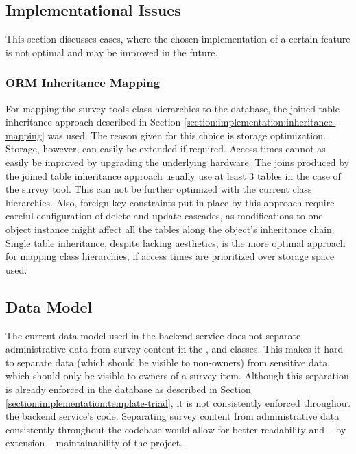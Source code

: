     \subsection{Implementational Issues}
    	This section discusses cases, where the chosen implementation
    	of a certain feature is not optimal and may be improved in the
    	future.

    	\subsubsection{ORM Inheritance Mapping}
    		For mapping the survey tools class hierarchies to the database,
    		the joined table inheritance approach described in Section
    		\ref{section:implementation:inheritance-mapping} was used.
    		The reason given for this choice is storage optimization.
    		Storage, however, can easily be extended if required.
    		Access times cannot as easily be improved by upgrading the
    		underlying hardware. The joins produced by the joined table
    		inheritance approach usually use at least 3 tables in the
    		case of the survey tool. This can not be further optimized
    		with the current class hierarchies. Also, foreign key
    		constraints put in place by this approach require
    		careful configuration of delete and update cascades,
    		as modifications to one object instance might affect
    		all the tables along the object's inheritance chain.
    		Single table inheritance, despite lacking aesthetics,
    		is the more optimal approach for mapping class hierarchies,
    		if access times are prioritized over storage space used.

    	\subsection{Data Model}
    		The current data model used in the backend service does
    		not separate administrative data from survey content
    		in the ,  and
    		 classes. This makes it hard to separate
    		data (which should be visible to non-owners) from
    		sensitive data, which should only be visible to owners
    		of a survey item. Although this separation is already
    		enforced in the database as described in Section \ref{section:implementation:template-triad},
    		it is not consistently enforced throughout the backend service's
    		code. Separating survey content from administrative
    		data consistently throughout the codebase would
    		allow for better readability and -- by extension --
    		maintainability of the project.

